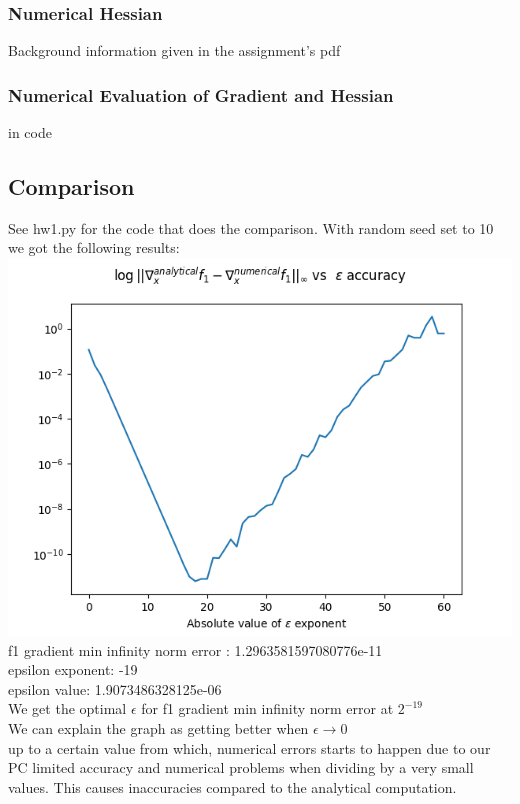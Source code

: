\documentclass[12pt]{article}
\begin{document}
\subsubsection{Numerical Hessian}
Background information given in the assignment's pdf
\subsubsection{Numerical Evaluation of Gradient and Hessian}
in code

\newpage

\subsection{Comparison}
See hw1.py for the code that does the comparison.
With random seed set to 10 we got the following results:\\
\includegraphics[scale=0.7]{f1_grad_plot}\\
f1 gradient min infinity norm error : 1.2963581597080776e-11\\ 
epsilon exponent: -19\\
epsilon value: 1.9073486328125e-06\\
We get the optimal $\epsilon$ for f1 gradient min infinity norm error at $2^{-19}$\\
We can explain the graph as getting better when $\epsilon \rightarrow 0$\\
up to a certain value from which, numerical errors starts to happen due to our PC limited accuracy and numerical problems when dividing by a very small values.
This causes inaccuracies compared to the analytical computation.
\end{document}
